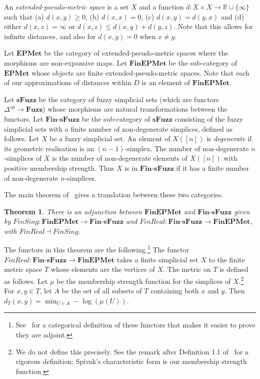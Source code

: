 \documentclass[a4paper,11pt,leqno]{article}
\newcommand{\RR}{\mathbb{R}}
\newtheorem*{thm}{Theorem}
\theoremstyle{definition}
\begin{document}
An \emph{extended-pseudo-metric space} is a set $X$ and a function $d: X\times X\to \RR\cup\{\infty\}$ such that (a) $d(x, y) \geq 0$, (b) $d(x, x) = 0$, (c) $d(x, y) = d(y, x)$ and (d) either $d(x, z) = \infty$ or $d(x, z) \leq d(x, y) + d(y, z)$.
Note that this allows for infinite distances, and also for $d(x, y) = 0$ when $x\not= y$.

Let $\textbf{EPMet}$ be the category of extended-pseudo-metric spaces where the morphisms are non-expansive maps.
Let $\textbf{FinEPMet}$ be the sub-category of $\textbf{EPMet}$ whose objects are finite extended-pseudo-metric spaces.
Note that each of our approximations of distances within $D$ is an element of $\textbf{FinEPMet}$.

Let $\textbf{sFuzz}$ be the category of fuzzy simplicial sets (which are functors $\Delta^{op}\to \textbf{Fuzz}$) whose morphisms are natural transformations between the functors.
Let $\textbf{Fin-sFuzz}$ be the sub-category of $\textbf{sFuzz}$ consisting of the fuzzy simplicial sets with a finite number of non-degenerate simplices, defined as follows.
Let $X$ be a fuzzy simplicial set.
An element of $X([n])$ is \emph{degenerate} if its geometric realisation is an $(n-1)$-simplex.
The number of non-degenerate $n$-simplices of $X$ is the number of non-degenerate elements of $X([n])$ with positive membership strength. 
Thus $X$ is in $\textbf{Fin-sFuzz}$ if it has a finite number of non-degenerate $n$-simplices.

The main theorem of~\cite{McInnes18} gives a translation between these two categories.
\begin{thm}
There is an adjunction between $\textbf{FinEPMet}$ and $\textbf{Fin-sFuzz}$ given by $FinSing: \textbf{FinEPMet}\to \textbf{Fin-sFuzz}$ and $FinReal: \textbf{Fin-sFuzz}\to \textbf{FinEPMet}$, with $FinReal\dashv FinSing$.
\end{thm}
The functors in this theorem are the following.\footnote{
See~\cite{McInnes18} for a categorical definition of these functors that makes it easier to prove they are adjoint.}
The functor $FinReal: \textbf{Fin-sFuzz}\to\textbf{FinEPMet}$ takes a finite simplicial set $X$ to the finite metric space $T$ whose elements are the vertices of $X$.
The metric on $T$ is defined as follows.
Let $\mu$ be the membership strength function for the simplices of $X$.\footnote{
We do not define this precisely. See the remark after Definition 1.1 of~\cite{Spivak} for a rigorous definition; Spivak's characteristic form is our membership strength function.}
For $x, y\in T$, let $A$ be the set of all subsets of $T$ containing both $x$ and $y$. 
Then $d_T(x, y) = \min_{U\in A} -\log(\mu(U))$.
\end{document}
